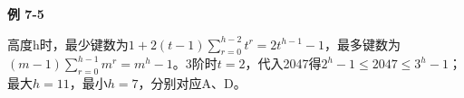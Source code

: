 {\color{ink}\bfseries 例 7-5}\par\vspace{1bp}高度h时，最少键数为\(1+\allowbreak{}2(t-1)\sum_{r=\allowbreak{}0}^{h-2}t^{r}=\allowbreak{}2t^{h-1}-1\)，最多键数为\((m-1)\sum_{r=\allowbreak{}0}^{h-1}m^{r}=\allowbreak{}m^{h}-1\)。3阶时\(t=\allowbreak{}2\)，代入2047得\(2^{h}-1\le 2047\le 3^{h}-1\)；最大\(h=\allowbreak{}11\)，最小\(h=\allowbreak{}7\)，分别对应A、D。
